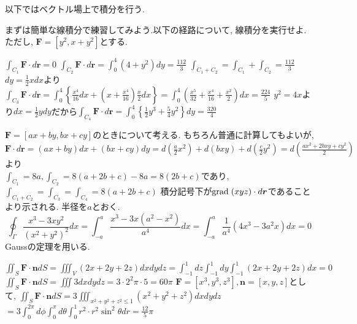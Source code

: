 \documentclass[a4j,dvipdfmx]{jsarticle}
\newcommand{\grad}{{\rm grad}\hspace{1mm}}
\begin{document}
    \clearpage
        以下ではベクトル場上で積分を行う.
        \begin{qparts}
            \qpart まずは簡単な線積分で練習してみよう.以下の経路について, 線積分を実行せよ.ただし, $\bm{F}=[y^2,x+y^2]$とする.
            \begin{qlist}
                \qitem $\int_{C_1}\bm{F}\cdot d\bm{r}=0$
                \qitem $\int_{C_2}\bm{F}\cdot d\bm{r}=\int_{0}^{4}(4+y^2)dy=\frac{112}{3}$
                \qitem $\int_{C_1+C_2}=\int_{C_1}+\int_{C_2}=\frac{112}{3}$
                \qitem $dy=\frac{1}{2}xdx$より$\int_{C_3}\bm{F}\cdot d\bm{r}=\int_0^4\left\{\frac{x^4}{16}dx+\left(x+\frac{x^4}{16}\right)\frac{x}{2}dx\right\}=\int_0^4\left(\frac{x^5}{32}+\frac{x^4}{16}+\frac{x^2}{2}\right)dx=\frac{224}{5}$
                \qitem $y^2=4x$より$dx=\frac{1}{2}ydy$だから$\int_{C_4}\bm{F}\cdot d\bm{r}=\int_0^4\left\{\frac{1}{2}y^3+\frac{5}{4}y^2\right\}dy=\frac{320}{4}$
            \end{qlist}
            $\bm{F}=[ax+by,bx+cy]$のときについて考える. もちろん普通に計算してもよいが, $\bm{F}\cdot d\bm{r}=(ax+by)dx+(bx+cy)dy=d\left(\frac{a}{2}x^2\right)+d(bxy)+d\left(\frac{c}{2}y^2\right)=d\left(\frac{ax^2+2bxy+cy^2}{2}\right)$より\\
            $\int_{C_1} = 8a,\int_{C_2}=8(a+2b+c)-8a=8(2b+c)$であり, $\int_{C_1+C_2}=\int_{C_3}=\int_{C_4}=8(a+2b+c)$
        \qpart 積分記号下が$\grad (xyz)\cdot d\bm{r}$であることより示される.
        \qpart 半径を$a$とおく.
            \begin{equation*}
                \oint_\Gamma \frac{x^3-3xy^2}{(x^2+y^2)^2}dx=\int_{-a}^{a} \frac{x^3-3x(a^2-x^2)}{a^4}dx=\int_{-a}^{a}\frac{1}{a^4}(4x^3-3a^2x)dx=0
            \end{equation*}
        \qpart Gaussの定理を用いる.
            \begin{qlist}
                \qitem $\displaystyle \iint_S \bm{F}\cdot\bm{n}dS=\iiint_V (2x+2y+2z)dxdydz=\int_{-1}^{1}dz\int_{-1}^{1}dy\int_{-1}^{1}(2x+2y+2z)dx=0$
                \qitem $\displaystyle \iint_S\bm{F}\cdot\bm{n}dS=\iiint3dxdydz=3\cdot 2^2\pi\cdot 5 = 60\pi$
                \qitem $\bm{F}=[x^3,y^3,z^3],\bm{n}=[x,y,z]$として, $\displaystyle \iint_S \bm{F}\cdot\bm{n}dS=3\iiint_{x^2+y^2+z^2\leq 1}(x^2+y^2+z^2)dxdydz$\\
                $\displaystyle=3\int_{0}^{2\pi}d\phi\int_{0}^{\pi}d\theta\int_{0}^{1}r^2\cdot r^2\sin^2\theta dr=\frac{12}{5}\pi$
            \end{qlist}
        \qpart 
            \begin{qlist}

\end{qlist}
\end{qparts}
\end{document}
